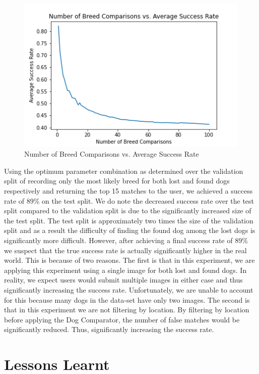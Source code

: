\documentclass{article}
\begin{document}
\begin{enumerate}
\begin{figure}[]
\centering
	\includegraphics[scale=0.7]{final-report-images/num_breed_comparison_accuracy.png}
\caption{Number of Breed Comparisons vs. Average Success Rate}
\label{fig:x breed comparisons}
\end{figure}

Using the optimum parameter combination as determined over the validation split of recording only the most likely breed for both lost and found dogs respectively and returning the top 15 matches to the user, we achieved a success rate of 89\% on the test split.  We do note the decreased success rate over the test split compared to the validation split is due to the significantly increased size of the test split.  The test split is approximately two times the size of the validation split and as a result the difficulty of finding the found dog among the lost dogs is significantly more difficult.  However, after achieving a final success rate of 89\% we suspect that the true success rate is actually significantly higher in the real world.  This is because of two reasons.  The first is that in this experiment, we are applying this experiment using a single image for both lost and found dogs.  In reality, we expect users would submit multiple images in either case and thus significantly increasing the success rate.  Unfortunately, we are unable to account for this because many dogs in the data-set have only two images.  The second is that in this experiment we are not filtering by location.  By filtering by location before applying the Dog Comparator, the number of false matches would be significantly reduced.  Thus, significantly increasing the success rate.

\newpage

\section{Lessons Learnt}



\end{enumerate}
\end{document}
